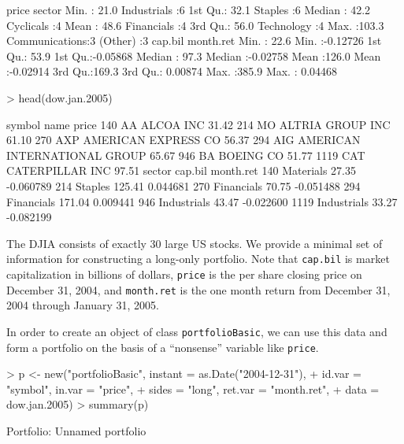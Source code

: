 \documentclass[a4paper]{report}
\begin{document}
\begin{article}
\begin{Schunk}
\begin{Soutput}
                                      
                                      
                                      
     price                  sector 
 Min.   : 21.0   Industrials   :6  
 1st Qu.: 32.1   Staples       :6  
 Median : 42.2   Cyclicals     :4  
 Mean   : 48.6   Financials    :4  
 3rd Qu.: 56.0   Technology    :4  
 Max.   :103.3   Communications:3  
                 (Other)       :3  
    cap.bil        month.ret       
 Min.   : 22.6   Min.   :-0.12726  
 1st Qu.: 53.9   1st Qu.:-0.05868  
 Median : 97.3   Median :-0.02758  
 Mean   :126.0   Mean   :-0.02914  
 3rd Qu.:169.3   3rd Qu.: 0.00874  
 Max.   :385.9   Max.   : 0.04468  
\end{Soutput}
\begin{Sinput}
> head(dow.jan.2005)
\end{Sinput}
\begin{Soutput}
     symbol                         name price
140      AA                    ALCOA INC 31.42
214      MO             ALTRIA GROUP INC 61.10
270     AXP          AMERICAN EXPRESS CO 56.37
294     AIG AMERICAN INTERNATIONAL GROUP 65.67
946      BA                    BOEING CO 51.77
1119    CAT              CATERPILLAR INC 97.51
          sector cap.bil month.ret
140    Materials   27.35 -0.060789
214      Staples  125.41  0.044681
270   Financials   70.75 -0.051488
294   Financials  171.04  0.009441
946  Industrials   43.47 -0.022600
1119 Industrials   33.27 -0.082199
\end{Soutput}
\end{Schunk}

The DJIA consists of exactly 30 large US stocks. We provide a minimal
set of information for constructing a long-only portfolio. Note that
\texttt{cap.bil} is market capitalization in billions of dollars,
\texttt{price} is the per share closing price on December 31, 2004,
and \texttt{month.ret} is the one month return from December 31, 2004
through January 31, 2005.

In order to create an object of class \texttt{portfolioBasic}, we can
use this data and form a portfolio on the basis of a ``nonsense''
variable like \texttt{price}.


\begin{Schunk}
\begin{Sinput}
> p <- new("portfolioBasic", instant = as.Date("2004-12-31"), 
+     id.var = "symbol", in.var = "price", 
+     sides = "long", ret.var = "month.ret", 
+     data = dow.jan.2005)
> summary(p)
\end{Sinput}
\begin{Soutput}
Portfolio: Unnamed portfolio


\end{Soutput}
\end{Schunk}
\end{article}
\end{document}

